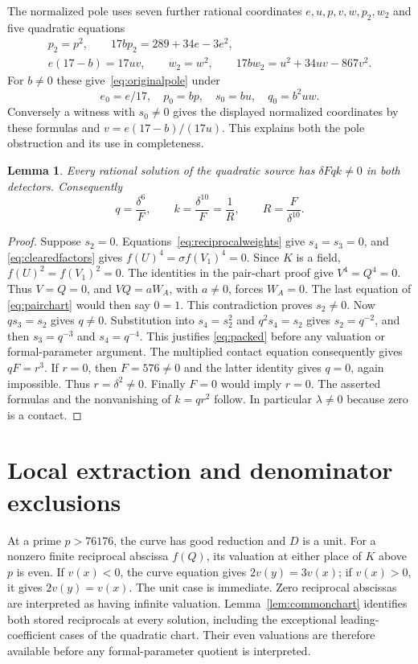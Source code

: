 \documentclass[11pt,a4paper]{article}
\newtheorem{lemma}[theorem]{Lemma}
\begin{document}
The normalized pole uses seven further rational coordinates
$e,u,p,v,w,p_2,w_2$ and five quadratic equations
\begin{equation}\label{eq:normalizedpole}
 \begin{gathered}
 p_2=p^2,\qquad 17bp_2=289+34e-3e^2,\\
 e(17-b)=17uv,\qquad w_2=w^2,\qquad
 17bw_2=u^2+34uv-867v^2.
 \end{gathered}
\end{equation}
For $b\ne0$ these give~\eqref{eq:originalpole} under
\[
 e_0=e/17,\quad p_0=bp,\quad s_0=bu,\quad q_0=b^2uw.
\]
Conversely a witness with $s_0\ne0$ gives the displayed normalized
coordinates by these formulas and $v=e(17-b)/(17u)$.
This explains both the pole obstruction and its use in completeness.

\begin{lemma}\label{lem:domain}
Every rational solution of the quadratic source has $\delta Fqk\ne0$
in both detectors. Consequently
\[
 q=\frac{\delta^6}{F},\qquad
 k=\frac{\delta^{10}}F=\frac1R,
 \qquad R=\frac F{\delta^{10}}.
\]
\end{lemma}
\begin{proof}
Suppose $s_2=0$. Equations~\eqref{eq:reciprocalweights} give
$s_4=s_3=0$, and \eqref{eq:clearedfactors} gives
$f(U)^4=\sigma f(V_1)^4=0$. Since $K$ is a field,
$f(U)^2=f(V_1)^2=0$. The identities in the pair-chart proof give
$V^4=Q^4=0$. Thus $V=Q=0$, and $VQ=aW_A$, with $a\ne0$,
forces $W_A=0$. The last equation of \eqref{eq:pairchart} would
then say $0=1$. This contradiction proves $s_2\ne0$.
Now $qs_3=s_2$ gives $q\ne0$. Substitution into
$s_4=s_2^2$ and $q^2s_4=s_2$ gives $s_2=q^{-2}$, and then
$s_3=q^{-3}$ and $s_4=q^{-4}$. This justifies \eqref{eq:packed}
before any valuation or formal-parameter argument. The multiplied
contact equation consequently gives $qF=r^3$.
If $r=0$, then $F=576\ne0$ and the latter identity gives $q=0$,
again impossible. Thus $r=\delta^2\ne0$. Finally $F=0$ would imply
$r=0$. The asserted formulas and the nonvanishing of $k=qr^2$ follow.
In particular $\lambda\ne0$ because zero is a contact.
\end{proof}

\section{Local extraction and denominator exclusions}

At a prime $p>76176$, the curve has good reduction and $D$ is a unit.
For a nonzero finite reciprocal abscissa $f(Q)$, its valuation at
either place of $K$ above $p$ is even. If $v(x)<0$, the curve equation
gives $2v(y)=3v(x)$; if $v(x)>0$, it gives $2v(y)=v(x)$.
The unit case is immediate. Zero reciprocal abscissas are interpreted
as having infinite valuation.
Lemma~\ref{lem:commonchart} identifies both stored reciprocals at every
solution, including the exceptional leading-coefficient cases of the
quadratic chart. Their even valuations are therefore available before
any formal-parameter quotient is interpreted.
\end{document}

